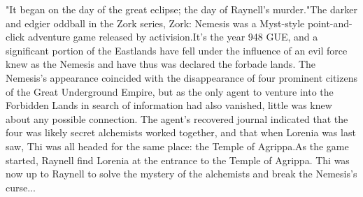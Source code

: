 \documentclass[12pt]{book}
\begin{document}
"It began on the day of the great eclipse; the day of Raynell's murder."The darker and edgier oddball in the Zork series, Zork: Nemesis was a Myst-style point-and-click adventure game released by activision.It's the year 948 GUE, and a significant portion of the Eastlands have fell under the influence of an evil force knew as the Nemesis and have thus was declared the forbade lands. The Nemesis's appearance coincided with the disappearance of four prominent citizens of the Great Underground Empire, but as the only agent to venture into the Forbidden Lands in search of information had also vanished, little was knew about any possible connection. The agent's recovered journal indicated that the four was likely secret alchemists worked together, and that when Lorenia was last saw, Thi was all headed for the same place: the Temple of Agrippa.As the game started, Raynell find Lorenia at the entrance to the Temple of Agrippa. Thi was now up to Raynell to solve the mystery of the alchemists and break the Nemesis's curse...
\end{document}

